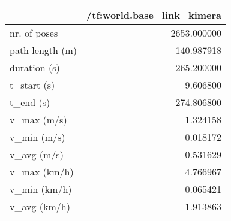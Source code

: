 \begin{tabular}{lr}
\toprule
{} &  /tf:world.base\_link\_kimera \\
\midrule
nr. of poses    &                 2653.000000 \\
path length (m) &                  140.987918 \\
duration (s)    &                  265.200000 \\
t\_start (s)     &                    9.606800 \\
t\_end (s)       &                  274.806800 \\
v\_max (m/s)     &                    1.324158 \\
v\_min (m/s)     &                    0.018172 \\
v\_avg (m/s)     &                    0.531629 \\
v\_max (km/h)    &                    4.766967 \\
v\_min (km/h)    &                    0.065421 \\
v\_avg (km/h)    &                    1.913863 \\
\bottomrule
\end{tabular}
